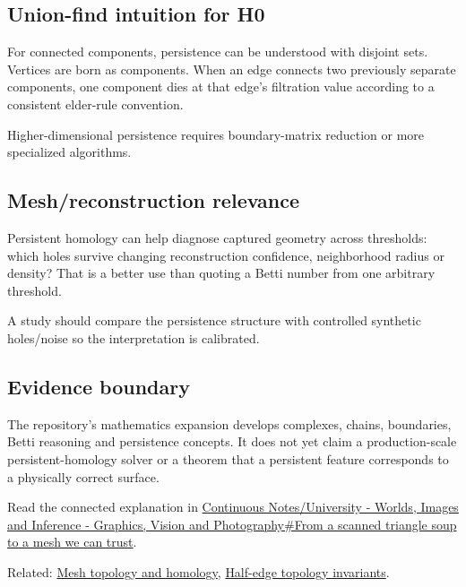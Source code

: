 \subsection{Union-find intuition for H0}\label{union-find-intuition-for-h0}

For connected components, persistence can be understood with disjoint sets. Vertices are born as components. When an edge connects two previously separate components, one component dies at that edge's filtration value according to a consistent elder-rule convention.

Higher-dimensional persistence requires boundary-matrix reduction or more specialized algorithms.

\subsection{Mesh/reconstruction relevance}\label{meshreconstruction-relevance}

Persistent homology can help diagnose captured geometry across thresholds: which holes survive changing reconstruction confidence, neighborhood radius or density? That is a better use than quoting a Betti number from one arbitrary threshold.

A study should compare the persistence structure with controlled synthetic holes/noise so the interpretation is calibrated.

\subsection{Evidence boundary}\label{evidence-boundary}

The repository's mathematics expansion develops complexes, chains, boundaries, Betti reasoning and persistence concepts. It does not yet claim a production-scale persistent-homology solver or a theorem that a persistent feature corresponds to a physically correct surface.

Read the connected explanation in \href{Continuous\%20Notes/University\%20-\%20Worlds,\%20Images\%20and\%20Inference\%20-\%20Graphics,\%20Vision\%20and\%20Photography\#From\%20a\%20scanned\%20triangle\%20soup\%20to\%20a\%20mesh\%20we\%20can\%20trust}{Continuous Notes/University - Worlds, Images and Inference - Graphics, Vision and Photography\#From a scanned triangle soup to a mesh we can trust}.

Related: \hyperref[appendix-e38976cbbf86]{Mesh topology and homology}, \hyperref[appendix-faac749c9cdd]{Half-edge topology invariants}.
